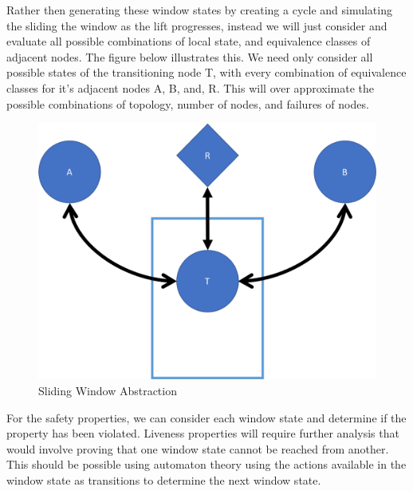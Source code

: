 \documentclass[article, onecolumn, 12pt]{IEEEtran}
\begin{document}
Rather then generating these window states by creating a cycle and simulating the sliding the window as the lift progresses, instead we will just consider and evaluate all possible combinations of local state, and equivalence classes of adjacent nodes.  The figure below illustrates this. We need only consider all possible states of the transitioning node T, with every combination of equivalence classes for it's adjacent nodes A, B, and, R. This will over approximate the possible combinations of topology, number of nodes, and failures of nodes.

\begin{figure}
    \centering
    \includegraphics[scale=0.7]{SlidingWindowAbstraction.png}
    \caption{Sliding Window Abstraction}
    \label{fig:slidingWindow}
\end{figure}

For the safety properties, we can consider each window state and determine if the property has been violated. Liveness properties will require further analysis that would involve proving that one window state cannot be reached from another. This should be possible using automaton theory using the actions available in the window state as transitions to determine the next window state.
\end{document}

